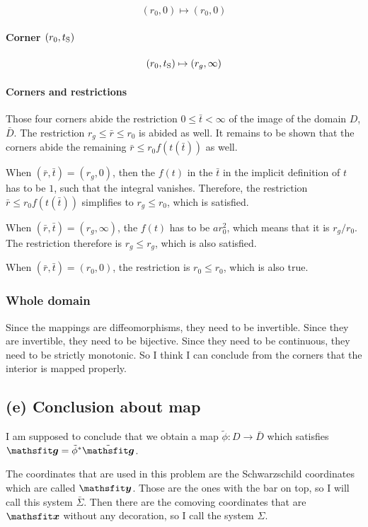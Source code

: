 \[
    (r_0, 0) \mapsto (r_0, 0)
\]

\paragraph{Corner $(r_0, t_\mathrm S)$}

\[
    (r_0, t_\mathrm S) \mapsto (r_g, \infty)
\]

\paragraph{Corners and restrictions}

Those four corners abide the restriction $0 \leq \bar t < \infty$ of the image
of the domain $D$, $\bar D$. The restriction $r_g \leq \bar r \leq r_0$ is
abided as well. It remains to be shown that the corners abide the remaining
$\bar r \leq r_0 f(t(\bar t))$ as well.

When $(\bar r, \bar t) = (r_g, 0)$, then the $f(t)$ in the $\bar t$ in the
implicit definition of $t$ has to be $1$, such that the integral vanishes.
Therefore, the restriction $\bar r \leq r_0 f(t(\bar t))$ simplifies to $r_g
\leq r_0$, which is satisfied.

When $(\bar r, \bar t) = (r_g, \infty)$, the $f(t)$ has to be $ar_0^2$, which
means that it is $r_g/r_0$. The restriction therefore is $r_g \leq r_g$,
which is also satisfied.

When $(\bar r, \bar t) = (r_0, 0)$, the restriction is $r_0 \leq r_0$, which is
also true.

\subsubsection*{Whole domain}

Since the mappings are diffeomorphisms, they need to be invertible. Since they
are invertible, they need to be bijective. Since they need to be continuous,
they need to be strictly monotonic. So I think I can conclude from the corners
that the interior is mapped properly.

\subsection*{(e) Conclusion about map}

I am supposed to conclude that we obtain a map $\tilde \phi \colon D \to \bar
D$ which satisfies $\tens g = \tilde \phi^* \tilde{\tens g}$.


The coordinates that are used in this problem are the Schwarzschild coordinates
which are called $\tens y$. Those are the ones with the bar on top, so I will
call this system $\bar \Sigma$. Then there are the comoving coordinates that
are $\tens x$ without any decoration, so I call the system $\Sigma$.

